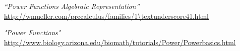 \documentclass[a4paper,12pt]{article}
\begin{document}













\begin{thebibliography}{3}
	
	 \emph{“Power Functions Algebraic Representation”} \url{http://wmueller.com/precalculus/families/1\textunderscore41.html} 
	
	 \emph{"Power Functions"} \url{http://www.biology.arizona.edu/biomath/tutorials/Power/Powerbasics.html}
	
\end{thebibliography}

\end{document}
